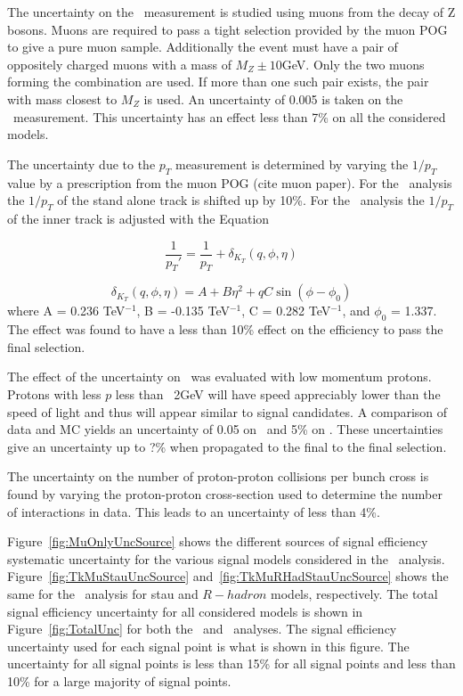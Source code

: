The uncertainty on the \invbeta\ measurement is studied using muons from the decay of Z bosons. Muons are required to pass a tight selection provided by the muon POG to
give a pure muon sample. Additionally the event must have a pair of oppositely charged muons with a mass of $M_Z \pm 10$GeV. Only the two muons forming the combination
are used. If more than one such pair exists, the pair with mass closest to $M_Z$ is used. An uncertainty of 0.005 is taken on the \invbeta\ measurement. This uncertainty
has an effect less than 7\% on all the considered models.

The uncertainty due to the $p_T$ measurement is determined by varying the $1/p_T$ value by a prescription from the muon POG (cite muon paper). For the \muononly\
analysis the $1/p_T$ of the stand alone track is shifted up by 10\%. For the \tktof\ analysis the $1/p_T$ of the inner track is adjusted with the Equation

\begin{equation}
 \frac{1}{p_T\prime} = \frac{1}{p_T} + \delta_{K_T}(q, \phi, \eta)
\end{equation}

\begin{equation}
 \delta_{K_T}(q, \phi, \eta) = A + B\eta^2 + qC\sin(\phi - \phi_0)
\end{equation}
where A = 0.236 TeV$^{-1}$, B = -0.135 TeV$^{-1}$,
C = 0.282 TeV$^{-1}$, and $\phi_0$ = 1.337. The effect was found to have a less than 10\% effect on the efficiency to pass the final selection.

The effect of the uncertainty on \dedx\ was evaluated with low momentum protons. Protons with less $p$ less than ~2GeV will have speed appreciably lower than the
speed of light and thus will appear similar to signal candidates. A comparison of data and MC yields an uncertainty of 0.05 on \ias\ and 5\% on \ih. These uncertainties
give an uncertainty up to ?\% when propagated to the final to the final selection. 

The uncertainty on the number of proton-proton collisions per bunch cross is found by varying the proton-proton cross-section used to determine the number of interactions
in data. This leads to an uncertainty of less than 4\%.

Figure~\ref{fig:MuOnlyUncSource} shows the different sources of signal efficiency systematic uncertainty for the various signal models considered in the \muononly\ analysis.
Figure~\ref{fig:TkMuStauUncSource} and~\ref{fig:TkMuRHadStauUncSource} shows the same for the \tktof\ analysis for stau and $R-hadron$ models, respectively. 
The total signal efficiency uncertainty for all considered models is shown in
Figure~\ref{fig:TotalUnc} for both the \muononly\ and \tktof\ analyses. The signal efficiency uncertainty used for each signal point is what is shown in this figure.
The uncertainty for all signal points is less than 15\% for all signal points and less than 10\% for a large majority of signal points.

